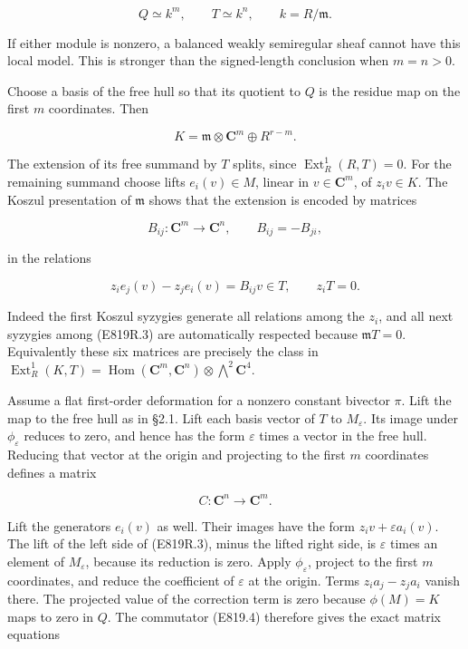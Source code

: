 \[
 Q\simeq k^m,\qquad T\simeq k^n,\qquad k=R/\mathfrak m.
 \tag{E819R.1}
\]

If either module is nonzero, a balanced weakly semiregular sheaf cannot
have this local model. This is stronger than the signed-length
conclusion when \(m=n>0\).

Choose a basis of the free hull so that its quotient to \(Q\) is the
residue map on the first \(m\) coordinates. Then

\[
 K=\mathfrak m\otimes\mathbf C^m\oplus R^{r-m}.
 \tag{E819R.2}
\]

The extension of its free summand by \(T\) splits, since
\(\operatorname{Ext}^1_R(R,T)=0\). For the remaining summand choose
lifts \(e_i(v)\in M\), linear in \(v\in\mathbf C^m\), of \(z_i v\in K\).
The Koszul presentation of \(\mathfrak m\) shows that the extension is
encoded by matrices

\[
 B_{ij}:\mathbf C^m\longrightarrow\mathbf C^n,\qquad
 B_{ij}=-B_{ji},
\]

in the relations

\[
 z_i e_j(v)-z_j e_i(v)=B_{ij}v\in T,
 \qquad z_i T=0.
 \tag{E819R.3}
\]

Indeed the first Koszul syzygies generate all relations among the
\(z_i\), and all next syzygies among (E819R.3) are automatically
respected because \(\mathfrak m T=0\). Equivalently these six matrices
are precisely the class in
\(\operatorname{Ext}^1_R(K,T)=\operatorname{Hom}(\mathbf C^m,\mathbf C^n)\otimes\bigwedge^2\mathbf C^4\).

Assume a flat first-order deformation for a nonzero constant bivector
\(\pi\). Lift the map to the free hull as in §2.1. Lift each basis
vector of \(T\) to \(M_\varepsilon\). Its image under
\(\phi_\varepsilon\) reduces to zero, and hence has the form
\(\varepsilon\) times a vector in the free hull. Reducing that vector at
the origin and projecting to the first \(m\) coordinates defines a
matrix

\[
 C:\mathbf C^n\longrightarrow\mathbf C^m.
\]

Lift the generators \(e_i(v)\) as well. Their images have the form
\(z_i v+\varepsilon a_i(v)\). The lift of the left side of (E819R.3),
minus the lifted right side, is \(\varepsilon\) times an element of
\(M_\varepsilon\), because its reduction is zero. Apply
\(\phi_\varepsilon\), project to the first \(m\) coordinates, and reduce
the coefficient of \(\varepsilon\) at the origin. Terms
\(z_i a_j-z_j a_i\) vanish there. The projected value of the correction
term is zero because \(\phi(M)=K\) maps to zero in \(Q\). The commutator
(E819.4) therefore gives the exact matrix equations

